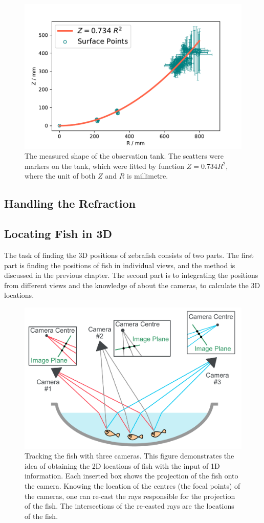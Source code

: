 \documentclass[11pt,twoside]{report}
\begin{document}
\begin{figure}
  \includegraphics[width=0.8\linewidth]{tank-fit.pdf}
  \caption{The measured shape of the observation tank. The scatters were markers on the tank, which were fitted by function $Z=0.734R^2$, where the unit of both $Z$ and $R$ is millimetre.}
  \label{fig:tank}
\end{figure}


\subsection{Handling the Refraction}



\subsection{Locating Fish in 3D}

The task of finding the 3D positions of zebrafish consists of two parts. The first part is finding the positions of fish in individual views, and the method is discussed in the previous chapter. The second part is to integrating the positions from different views and the knowledge of about the cameras, to calculate the 3D locations.


\begin{figure}
  \includegraphics[width=0.8\linewidth]{track-3d-idea}
  \caption{Tracking the fish with three cameras. This figure demonstrates the idea of obtaining the 2D locations of fish with the input of 1D information. Each inserted box shows the projection of the fish onto the camera. Knowing the location of the centres (the focal points) of the cameras, one can re-cast the rays responsible for the projection of the fish. The intersections of the re-casted rays are the locations of the fish.}
  \label{fig:track_idea_3d}
\end{figure}
\end{document}
